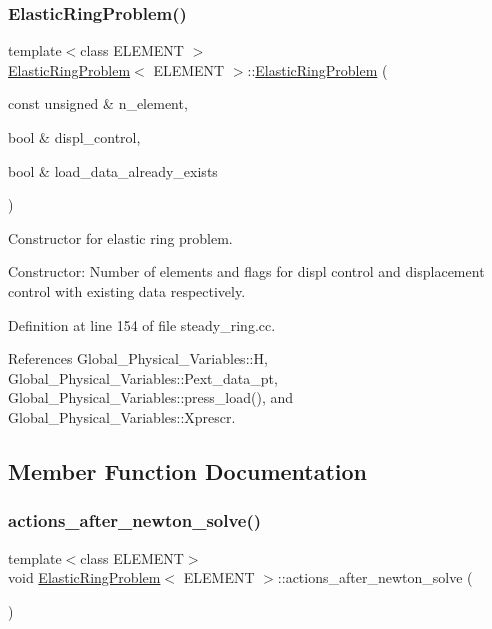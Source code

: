 \subsubsection{\texorpdfstring{Elastic\+Ring\+Problem()}{ElasticRingProblem()}}
{\footnotesize\ttfamily template$<$class E\+L\+E\+M\+E\+NT $>$ \\
\hyperlink{classElasticRingProblem}{Elastic\+Ring\+Problem}$<$ E\+L\+E\+M\+E\+NT $>$\+::\hyperlink{classElasticRingProblem}{Elastic\+Ring\+Problem} (\begin{DoxyParamCaption}\item[{const unsigned \&}]{n\+\_\+element,  }\item[{bool \&}]{displ\+\_\+control,  }\item[{bool \&}]{load\+\_\+data\+\_\+already\+\_\+exists }\end{DoxyParamCaption})}



Constructor for elastic ring problem. 

Constructor\+: Number of elements and flags for displ control and displacement control with existing data respectively. 

Definition at line 154 of file steady\+\_\+ring.\+cc.



References Global\+\_\+\+Physical\+\_\+\+Variables\+::H, Global\+\_\+\+Physical\+\_\+\+Variables\+::\+Pext\+\_\+data\+\_\+pt, Global\+\_\+\+Physical\+\_\+\+Variables\+::press\+\_\+load(), and Global\+\_\+\+Physical\+\_\+\+Variables\+::\+Xprescr.



\subsection{Member Function Documentation}
\mbox{\label{classElasticRingProblem_a58c2889fd4db8c17f4a4d964a5a7a90d}} 
\subsubsection{\texorpdfstring{actions\+\_\+after\+\_\+newton\+\_\+solve()}{actions\_after\_newton\_solve()}}
{\footnotesize\ttfamily template$<$class E\+L\+E\+M\+E\+NT$>$ \\
void \hyperlink{classElasticRingProblem}{Elastic\+Ring\+Problem}$<$ E\+L\+E\+M\+E\+NT $>$\+::actions\+\_\+after\+\_\+newton\+\_\+solve (\begin{DoxyParamCaption}{ }\end{DoxyParamCaption})\hspace{0.3cm}{\ttfamily [inline]}}



